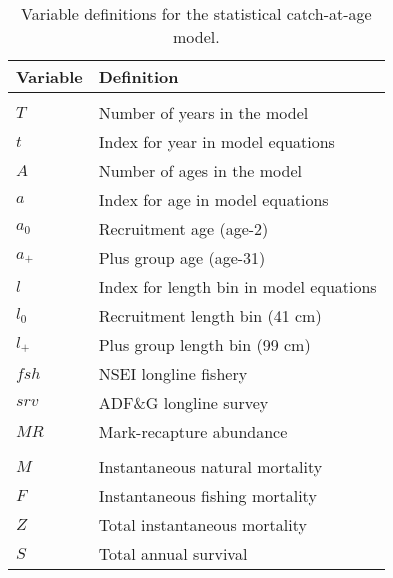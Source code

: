 \documentclass[
]{article}
\begin{document}
\begin{longtable}[t]{ll}
\caption{\label{tab:vardefns}Variable definitions for the statistical catch-at-age model.}\\
\toprule
Variable & Definition\\
\midrule
\addlinespace[0.3em]
\multicolumn{2}{l}{\textbf{$\textit{Indexing and model dimensions}$}}\\
\hspace{1em}$T$ & Number of years in the model\\
\hspace{1em}$t$ & Index for year in model equations\\
\hspace{1em}$A$ & Number of ages in the model\\
\hspace{1em}$a$ & Index for age in model equations\\
\hspace{1em}$a_0$ & Recruitment age (age-2)\\
\hspace{1em}$a_{+}$ & Plus group age (age-31)\\
\hspace{1em}$l$ & Index for length bin in model equations\\
\hspace{1em}$l_0$ & Recruitment length bin (41 cm)\\
\hspace{1em}$l_{+}$ & Plus group length bin (99 cm)\\
\hspace{1em}$fsh$ & NSEI longline fishery\\
\hspace{1em}$srv$ & ADF\&G longline survey\\
\hspace{1em}$MR$ & Mark-recapture abundance\\
\addlinespace[0.3em]
\multicolumn{2}{l}{\textbf{$\textit{Parameters}$}}\\
\hspace{1em}$M$ & Instantaneous natural mortality\\
\hspace{1em}$F$ & Instantaneous fishing mortality\\
\hspace{1em}$Z$ & Total instantaneous mortality\\
\hspace{1em}$S$ & Total annual survival\\

\end{longtable}
\end{document}
